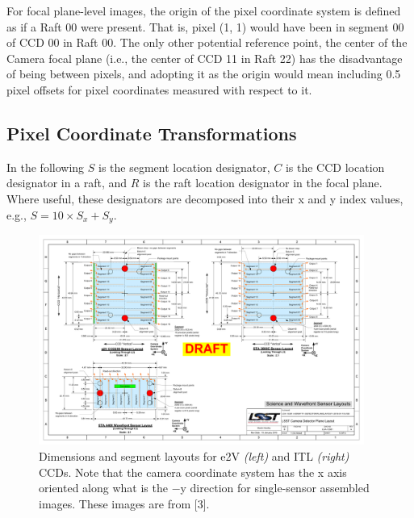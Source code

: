 \documentclass{article}[12pt]
\begin{document}
For focal plane-level images, the origin of the pixel coordinate system is defined as if a Raft 00 were present.  That is, pixel (1, 1) would have been in segment 00 of CCD 00 in Raft 00.  The only other potential reference point, the center of the Camera focal plane (i.e., the center of CCD 11 in Raft 22) has the disadvantage of being between pixels, and adopting it as the origin would mean including 0.5 pixel offsets for pixel coordinates measured with respect to it.

\subsection{Pixel Coordinate Transformations}
In the following $S$ is the segment location designator, $C$ is the CCD location designator in a raft, and $R$ is the raft location designator in the focal plane.  Where useful, these designators are decomposed into their x and y index values, e.g., $S = 10 \times S_x + S_y$.

\begin{figure}
\centering
    \includegraphics[width=0.95\textwidth]{sensor_layout.pdf}
    \caption{Dimensions and segment layouts for e2V {\it (left)} and ITL {\it (right)} CCDs.  Note that the camera coordinate system has the x axis oriented along what is the $-$y direction for single-sensor assembled images.  These images are from [3].}
    \label{fig:sensor}
\end{figure}
\end{document}

